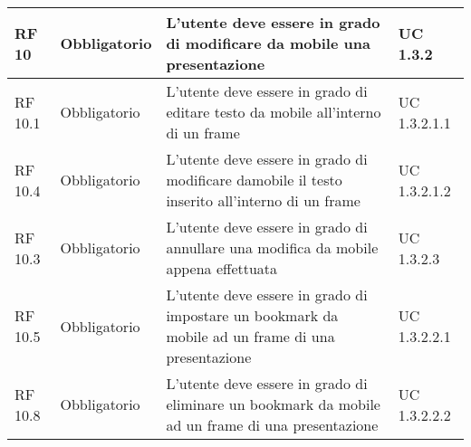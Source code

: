 {\begin{longtable} [c]{| p{2.5cm} | p{2.5cm} | p{6cm} |p{2.5cm}|}
			\hline
			RF 10 & Obbligatorio & L'utente deve essere in grado di modificare da mobile una presentazione & UC 1.3.2\\
			\hline
			RF 10.1 & Obbligatorio & L'utente deve essere in grado di editare testo da mobile all'interno di un frame & UC 1.3.2.1.1\\
			\hline
			RF 10.4 & Obbligatorio & L'utente deve essere in grado di modificare damobile il testo inserito all'interno di un frame & UC 1.3.2.1.2\\
			\hline
			RF 10.3 & Obbligatorio & L'utente deve essere in grado di annullare una modifica da mobile appena effettuata & UC 1.3.2.3\\
			\hline
			RF 10.5 & Obbligatorio & L'utente deve essere in grado di impostare un bookmark da mobile ad un frame di una presentazione & UC 1.3.2.2.1\\
			\hline
			RF 10.8 & Obbligatorio & L'utente deve essere in grado di eliminare un bookmark da mobile ad un frame di una presentazione & UC 1.3.2.2.2\\
			

\end{longtable}}

